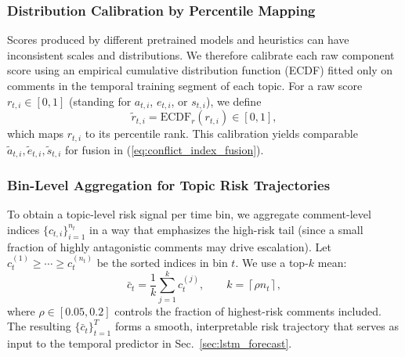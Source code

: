 \documentclass[journal]{IEEEtran}
\begin{document}
\subsubsection{Distribution Calibration by Percentile Mapping}\label{sec:calibration}
Scores produced by different pretrained models and heuristics can have inconsistent scales and distributions. We therefore calibrate each raw component score using an empirical cumulative distribution function (ECDF) fitted only on comments in the temporal training segment of each topic. For a raw score $r_{t,i}\in[0,1]$ (standing for $a_{t,i}$, $e_{t,i}$, or $s_{t,i}$), we define
\begin{equation}
\tilde{r}_{t,i} = \mathrm{ECDF}_r(r_{t,i}) \in [0,1],
\label{eq:ecdf}
\end{equation}
which maps $r_{t,i}$ to its percentile rank. This calibration yields comparable $\tilde{a}_{t,i},\tilde{e}_{t,i},\tilde{s}_{t,i}$ for fusion in (\ref{eq:conflict_index_fusion}).

\subsubsection{Bin-Level Aggregation for Topic Risk Trajectories}
To obtain a topic-level risk signal per time bin, we aggregate comment-level indices $\{c_{t,i}\}_{i=1}^{n_t}$ in a way that emphasizes the high-risk tail (since a small fraction of highly antagonistic comments may drive escalation). Let $c^{(1)}_t \ge \cdots \ge c^{(n_t)}_t$ be the sorted indices in bin $t$. We use a top-$k$ mean:
\begin{equation}
\bar{c}_t = \frac{1}{k}\sum_{j=1}^{k} c^{(j)}_t,\qquad k=\left\lceil \rho n_t \right\rceil,
\label{eq:topk_agg}
\end{equation}
where $\rho\in[0.05,0.2]$ controls the fraction of highest-risk comments included. The resulting $\{\bar{c}_t\}_{t=1}^T$ forms a smooth, interpretable risk trajectory that serves as input to the temporal predictor in Sec.~\ref{sec:lstm_forecast}.
\end{document}
